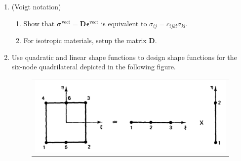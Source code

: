 \documentclass[12pt]{article}
\begin{document}
\begin{enumerate}
\begin{enumerate}
\item Consider the weak-form problem for elastostatics,
\begin{align*}
\int_{\Omega} w_{(i,j)} \sigma_{ij}d\Omega = \int_{\Omega} w_i f_i d\Omega + \int_{\Gamma_h} w_i h_i d\Gamma.
\end{align*}
If the test and trail function spaces are constructed by $C^0$ basis functions, show that
\begin{align*}
0 = \sum_{e=1}^{n_{el}} \int_{\Omega^e} w^h_i \left( \sigma^h_{ij,j} + f_i \right)d\Omega - \int_{\Gamma_h} w^h_i \left( \sigma^h_{ij}n_j - h_i \right) d\Gamma - \int_{\Gamma_{\mathrm{int}}} w^h_i \llbracket \sigma_{ij}n_j\rrbracket d\Gamma,
\end{align*}
wherein
\begin{align*}
\Gamma_{\mathrm{int}} := \cup_{e=1}^{n_{el}} \partial \Omega^e - \partial \Omega.
\end{align*}
From the above Euler-Lagrange equation, one may readily conclude that the Galerkin formulation implies
\begin{align*}
& \sigma_{ij,j} + f_i = 0, && \mbox{ in } \cup_{e=1}^{n_{el}} \Omega^e, \displaybreak[2]\\
& \sigma_{ij}n_j = h_i, && \mbox{ on } \Gamma_h, \displaybreak[2]\\
& \llbracket \sigma_{ij}n_j\rrbracket = 0, && \mbox{ on } \Gamma_{\mathrm{int}}.
\end{align*}
\end{enumerate}

\item(Voigt notation) 
\begin{enumerate}
\item Show that $\bm \sigma^{\mathrm{vect}} = \bm D \bm \epsilon^{\mathrm{vect}}$ is equivalent to $\sigma_{ij} = c_{ijkl} \sigma_{kl}$.
\item For isotropic materials, setup the matrix $\bm D$.
\end{enumerate}


\item Use quadratic and linear shape functions to design shape functions for the six-node quadrilateral depicted in the following figure.

\begin{figure}[h]
	\begin{center}
	\begin{tabular}{c}
\includegraphics[angle=0, trim=0 0 0 0, clip=true, scale = 0.35]{./6node-elem.pdf}
\end{tabular}
\end{center} 
\label{fig:quad_elem}
\end{figure}

\end{enumerate}
\end{document}
